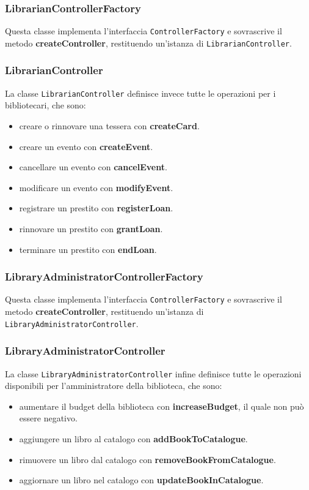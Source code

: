     \subsubsection{LibrarianControllerFactory}
    Questa classe implementa l'interfaccia \texttt{ControllerFactory} e sovrascrive il metodo \textbf{createController}, restituendo un'istanza di \texttt{LibrarianController}.

    \subsubsection{LibrarianController}
    La classe \texttt{LibrarianController} definisce invece tutte le operazioni per i bibliotecari, che sono:
    \begin{itemize}
        \item creare o rinnovare una tessera con \textbf{createCard}.
        \item creare un evento con \textbf{createEvent}.
        \item cancellare un evento con \textbf{cancelEvent}.
        \item modificare un evento con \textbf{modifyEvent}.
        \item registrare un prestito con \textbf{registerLoan}.
        \item rinnovare un prestito con \textbf{grantLoan}.
        \item terminare un prestito con \textbf{endLoan}.
    \end{itemize}

    \subsubsection{LibraryAdministratorControllerFactory}
    Questa classe implementa l'interfaccia \texttt{ControllerFactory} e sovrascrive il metodo \textbf{createController}, restituendo un'istanza di \texttt{LibraryAdministratorController}.

    \subsubsection{LibraryAdministratorController}
    La classe \texttt{LibraryAdministratorController} infine definisce tutte le operazioni disponibili per l'amministratore della biblioteca, che sono:
    \begin{itemize}
        \item aumentare il budget della biblioteca con \textbf{increaseBudget}, il quale non può essere negativo.
        \item aggiungere un libro al catalogo con \textbf{addBookToCatalogue}.
        \item rimuovere un libro dal catalogo con \textbf{removeBookFromCatalogue}.
        \item aggiornare un libro nel catalogo con \textbf{updateBookInCatalogue}.
    \end{itemize}

